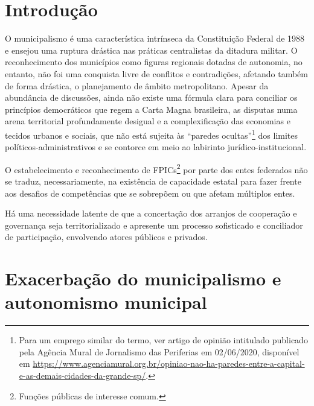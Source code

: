 \documentclass[
article,			%
11pt,				%
oneside,			%
a4paper,			%
english,			%
brazil,				%
sumario=tradicional
]{abntex2}
\begin{document}
	\textual
	

	\section{Introdução}
	
	O municipalismo é uma característica intrínseca da Constituição Federal de 1988 e ensejou uma ruptura drástica nas práticas centralistas da ditadura militar. O reconhecimento dos municípios como figuras regionais dotadas de autonomia, no entanto, não foi uma conquista livre de conflitos e contradições, afetando também de forma drástica, o planejamento de âmbito metropolitano. Apesar da abundância de discussões, ainda não existe uma fórmula clara para conciliar os princípios democráticos que regem a Carta Magna brasileira, as disputas numa arena territorial profundamente desigual e a complexificação das economias e tecidos urbanos e sociais, que não está sujeita às ``paredes ocultas''\footnote{Para um emprego similar do termo, ver artigo de opinião intitulado publicado pela Agência Mural de Jornalismo das Periferias em 02/06/2020, disponível em \url{https://www.agenciamural.org.br/opiniao-nao-ha-paredes-entre-a-capital-e-as-demais-cidades-da-grande-sp/}.} dos limites políticos-administrativos e se contorce em meio ao labirinto jurídico-institucional.
	
	O estabelecimento e reconhecimento de FPICs\footnote{Funções públicas de interesse comum.} por parte dos entes federados não se traduz, necessariamente, na existência de capacidade estatal para fazer frente aos desafios de competências que se sobrepõem ou que afetam múltiplos entes.
	
	Há uma necessidade latente de que a concertação dos arranjos de cooperação e governança seja territorializado e apresente um processo sofisticado e conciliador de participação, envolvendo atores públicos e privados.
	
	\section{Exacerbação do municipalismo e autonomismo municipal}
	
\end{document}
